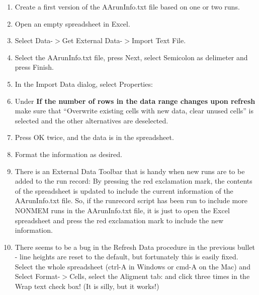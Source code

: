 \begin{enumerate}
	\item Create a first version of the AArunInfo.txt file based on one or two runs.
	\item Open an empty spreadsheet in Excel.
	\item Select Data-$>$Get External Data-$>$Import Text File.
	\item Select the AArunInfo.txt file, press Next, select Semicolon as delimeter and press Finish.
	\item In the Import Data dialog, select Properties:
	\item Under {\bf If the number of rows in the data range changes upon refresh} make sure that ``Overwrite existing cells with new data, clear unused cells'' is selected and the other alternatives are deselected. 
	\item Press OK twice, and the data is in the spreadsheet.
	\item Format the information as desired.
	\item There is an External Data Toolbar that is handy when new runs are to be added to the run record:
By pressing the red exclamation mark, the contents of the spreadsheet is updated to include the current information of the AArunInfo.txt file. So, if the runrecord script has been run to include more NONMEM runs in the AArunInfo.txt file, it is just to open the Excel spreadsheet and press the red exclamation mark to include the new information.
	\item There seems to be a bug in the Refresh Data procedure in the previous bullet - line heights are reset to the default, but fortunately this is easily fixed. Select the whole spreadsheet (ctrl-A in Windows or cmd-A on the Mac) and Select Format-$>$Cells, select the Aligment tab:
and click three times in the Wrap text check box! (It is silly, but it works!)
\end{enumerate}


